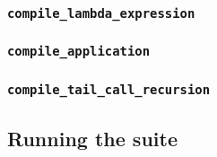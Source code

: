 \subsubsection{\texttt{compile\_lambda\_expression}}

\subsubsection{\texttt{compile\_application}}

\subsubsection{\texttt{compile\_tail\_call\_recursion}}

\subsection{Running the suite}

